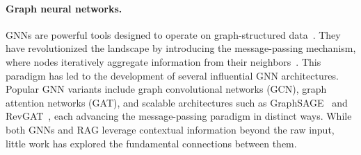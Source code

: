 \paragraph{Graph neural networks.}
GNNs are powerful tools designed to operate on graph-structured data~\cite{message_passing}.
They have revolutionized the landscape by introducing the message-passing mechanism, where nodes iteratively aggregate information from their neighbors~\cite{chen2020survey}.
This paradigm has led to the development of several influential GNN architectures.
Popular GNN variants include graph convolutional networks (GCN)\cite{gcn}, graph attention networks (GAT)\cite{gat}, and scalable architectures such as GraphSAGE~\cite{graphsage} and RevGAT~\cite{revgat}, each advancing the message-passing paradigm in distinct ways.
While both GNNs and RAG leverage contextual information beyond the raw input, little work has explored the fundamental connections between them.
